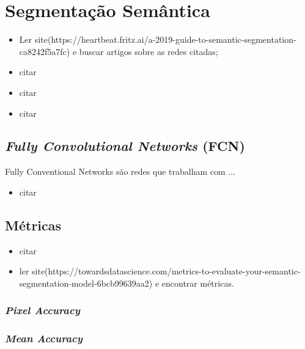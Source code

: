 \newpage
\section{Segmentação Semântica}
\begin{itemize}
    \item Ler site(https://heartbeat.fritz.ai/a-2019-guide-to-semantic-segmentation-ca8242f5a7fc) e buscar artigos sobre as redes citadas;
    \item citar \cite{Minaee2021}
    \item citar \cite{Arbelaez2012}
    \item citar \cite{Zhang2018}
\end{itemize}


\subsection{\textit{Fully Convolutional Networks} (FCN)}
\label{semantic:FCN}
Fully Conventional Networks são redes que trabalham com ... 
\begin{itemize}
    \item citar \cite{Shelhamer2016}
\end{itemize}


\subsection{Métricas}
\begin{itemize}
    \item citar \cite{Csurka}
    \item ler site(https://towardsdatascience.com/metrics-to-evaluate-your-semantic-segmentation-model-6bcb99639aa2) e encontrar métricas.
\end{itemize}
\subsubsection{\textit{Pixel Accuracy}}
\subsubsection{\textit{Mean Accuracy}}

